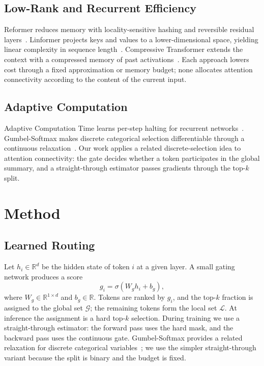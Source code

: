 \documentclass[10pt]{article}
\begin{document}
\subsection{Low-Rank and Recurrent Efficiency}
\label{sec:low_rank}
Reformer reduces memory with locality-sensitive hashing and reversible residual layers~\cite{Kitaev2020Reformer}. Linformer projects keys and values to a lower-dimensional space, yielding linear complexity in sequence length~\cite{Wang2020Linformer}. Compressive Transformer extends the context with a compressed memory of past activations~\cite{Rae2020Compressive}. Each approach lowers cost through a fixed approximation or memory budget; none allocates attention connectivity according to the content of the current input.

\subsection{Adaptive Computation}
\label{sec:adaptive}
Adaptive Computation Time learns per-step halting for recurrent networks~\cite{Graves2016Adaptive}. Gumbel-Softmax makes discrete categorical selection differentiable through a continuous relaxation~\cite{Jang2017Categorical}. Our work applies a related discrete-selection idea to attention connectivity: the gate decides whether a token participates in the global summary, and a straight-through estimator passes gradients through the top-$k$ split.


\section{Method}
\label{sec:method}

\subsection{Learned Routing}
\label{sec:routing}
Let $h_i \in \mathbb{R}^d$ be the hidden state of token $i$ at a given layer. A small gating network produces a score
\begin{equation}
  g_i = \sigma(W_g h_i + b_g),
  \label{eq:gate}
\end{equation}
where $W_g \in \mathbb{R}^{1 \times d}$ and $b_g \in \mathbb{R}$. Tokens are ranked by $g_i$, and the top-$k$ fraction is assigned to the global set $\mathcal{G}$; the remaining tokens form the local set $\mathcal{L}$. At inference the assignment is a hard top-$k$ selection. During training we use a straight-through estimator: the forward pass uses the hard mask, and the backward pass uses the continuous gate. Gumbel-Softmax provides a related relaxation for discrete categorical variables~\cite{Jang2017Categorical}; we use the simpler straight-through variant because the split is binary and the budget is fixed.
\end{document}
